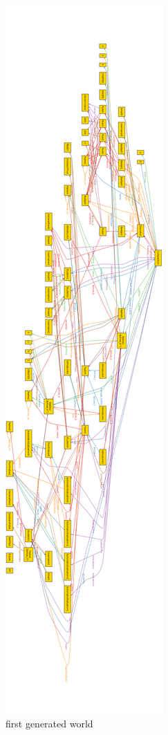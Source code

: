 \begin{figure}[H]
    \centering
    \includegraphics[height=\textheight]{Images/alloy/alloy_gen_01.png}
    \caption{first generated world}
\end{figure}

